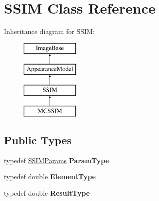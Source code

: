 \hypertarget{classSSIM}{\section{S\-S\-I\-M Class Reference}
\label{classSSIM}
}
Inheritance diagram for S\-S\-I\-M\-:\begin{figure}[H]
\begin{center}
\leavevmode
\includegraphics[height=4.000000cm]{classSSIM}
\end{center}
\end{figure}
\subsection*{Public Types}
\begin{DoxyCompactItemize}
\item 
\hypertarget{classSSIM_a023a5367263c9e60382ec1d12e65a686}{typedef \hyperlink{structSSIMParams}{S\-S\-I\-M\-Params} {\bfseries Param\-Type}}\label{classSSIM_a023a5367263c9e60382ec1d12e65a686}

\item 
\hypertarget{classSSIM_aeddb143d6bc5bcf4032dfa275ac1c628}{typedef double {\bfseries Element\-Type}}\label{classSSIM_aeddb143d6bc5bcf4032dfa275ac1c628}

\item 
\hypertarget{classSSIM_a54dbc3660c1a56ecefd02d612fb6b176}{typedef double {\bfseries Result\-Type}}\label{classSSIM_a54dbc3660c1a56ecefd02d612fb6b176}

\end{DoxyCompactItemize}
